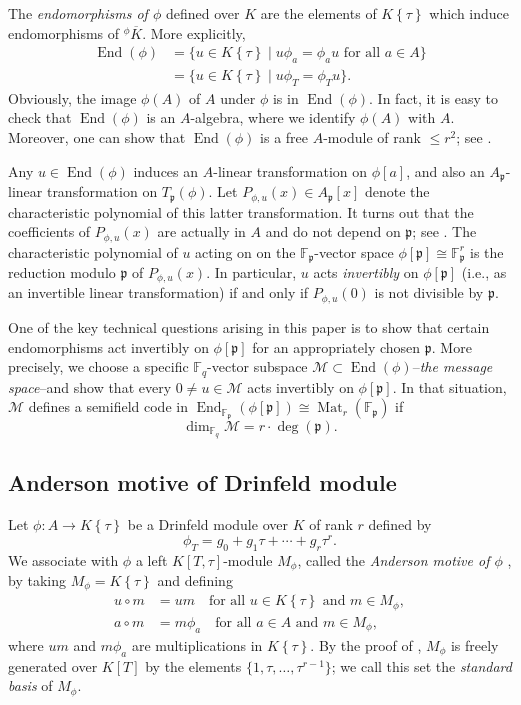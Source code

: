 \documentclass[12pt]{amsart}
\theoremstyle{definition}
\theoremstyle{remark}
\numberwithin{equation}{section}
\numberwithin{thm}{section}
\DeclareMathOperator{\End}{End}
\DeclareMathOperator{\Mat}{Mat}
\newcommand{\fp}{\mathfrak{p}}
\newcommand{\cM}{\mathcal{M}}
\newcommand{\F}{\mathbb{F}}
\newcommand{\oK}{\overline{K}}
\newcommand{\twist}[1]{#1\!\left\{\tau\right\}}
\begin{document}
The \textit{endomorphisms of $\phi$} defined over $K$ are the elements of $\twist{K}$ which induce endomorphisms of ${^\phi}\oK$. More explicitly,
\begin{align*}
\End(\phi) &=\{u\in \twist{K}\mid u\phi_a=\phi_au\text{ for all }a\in A\} \\ 
& = \{u\in \twist{K}\mid u\phi_T=\phi_Tu\}. 
\end{align*}
Obviously, the image $\phi(A)$ of $A$ under $\phi$ is in $\End(\phi)$. In fact, it is easy to check that $\End(\phi)$ is an $A$-algebra, where we 
identify $\phi(A)$ with $A$. Moreover, one can show 
that $\End(\phi)$ is a free $A$-module of rank $\leq r^2$; see \cite[Thm. 3.4.1]{PapikianGTM}. 

Any $u\in \End(\phi)$ induces an $A$-linear transformation on $\phi[a]$, and also an $A_\fp$-linear transformation on $T_\fp(\phi)$. 
Let $P_{\phi, u}(x)\in A_\fp[x]$ denote the characteristic polynomial of this latter transformation. It turns out that the coefficients of $P_{\phi, u}(x)$ are 
actually in $A$ and do not depend on $\fp$; see \cite[Thm. 3.6.6]{PapikianGTM}. The characteristic polynomial of $u$ acting on 
on the $\F_\fp$-vector space $\phi[\fp]\cong \F_\fp^r$ is the reduction modulo $\fp$ of $P_{\phi, u}(x)$. In particular, $u$ acts \textit{invertibly} on $\phi[\fp]$ 
 (i.e., as an invertible linear transformation) if and only if $P_{\phi, u}(0)$ is not divisible by $\fp$.  
 
 One of the key technical questions arising in this 
 paper is to show that certain endomorphisms act invertibly on $\phi[\fp]$ for an appropriately chosen $\fp$. More precisely, 
 we choose a specific $\F_q$-vector subspace $\cM\subset \End(\phi)$--\textit{the message space}--and show that every $0\neq u\in \cM$
acts invertibly on $\phi[\fp]$. In that situation, $\cM$ defines a semifield code in $\End_{\F_\fp}(\phi[\fp])\cong \Mat_r(\F_\fp)$ if 
\begin{equation}\label{eqSFdim}
\dim_{\F_q}\cM=r\cdot \deg(\fp). 
\end{equation}
 
 \subsection{Anderson motive of Drinfeld module}\label{secMotive} Let $\phi\colon A\to 
 \twist{K}$ be a Drinfeld module over $K$ of rank $r$ defined by 
 $$
 \phi_T=g_0+g_1\tau+\cdots+g_r\tau^r. 
 $$
 We associate with $\phi$ a left $K[T, \tau]$-module $M_\phi$, called the \textit{Anderson motive of $\phi$} \cite{Anderson}, by taking $M_\phi=\twist{K}$ and defining 
 \begin{align*}
 	u\circ m & = um \quad \text{for all $u\in \twist{K}$ and $m\in M_\phi$}, \\ 
 	a\circ m & = m\phi_a \quad \text{for all $a\in A$ and $m\in M_\phi$}, 
 \end{align*}
 where $um$ and $m\phi_a$ are multiplications in $\twist{K}$. By the proof of \cite[Lem. 3.4.4]{PapikianGTM}, $M_\phi$ 
 is freely generated over $K[T]$ by the elements  $\{1, \tau, \dots, \tau^{r-1}\}$; we call this set the \textit{standard basis} of $M_\phi$. 
 
\end{document}
